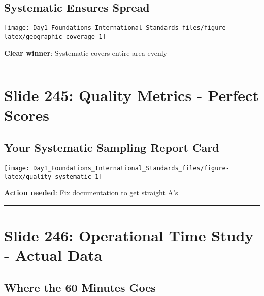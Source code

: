 \documentclass[
]{article}
\begin{document}
\subsection{Systematic Ensures Spread}\label{systematic-ensures-spread}

\texttt{[image: Day1\_Foundations\_International\_Standards\_files/figure-latex/geographic-coverage-1]}

\textbf{Clear winner}: Systematic covers entire area evenly

\begin{center}\rule{0.5\linewidth}{0.5pt}\end{center}

\section{Slide 245: Quality Metrics - Perfect
Scores}\label{slide-245-quality-metrics---perfect-scores}

\subsection{Your Systematic Sampling Report
Card}\label{your-systematic-sampling-report-card}

\texttt{[image: Day1\_Foundations\_International\_Standards\_files/figure-latex/quality-systematic-1]}

\textbf{Action needed}: Fix documentation to get straight A's

\begin{center}\rule{0.5\linewidth}{0.5pt}\end{center}

\section{Slide 246: Operational Time Study - Actual
Data}\label{slide-246-operational-time-study---actual-data}

\subsection{Where the 60 Minutes Goes}\label{where-the-60-minutes-goes}
\end{document}
